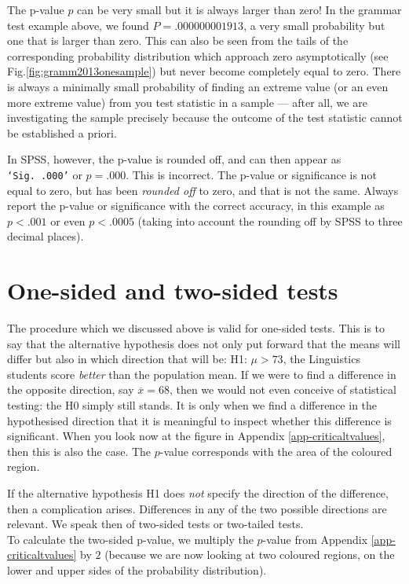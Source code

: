 \documentclass[
]{book}
\begin{document}
The p-value \(p\) can be very small but it is always larger than zero!
In the grammar test example above,
we found \(P=.000000001913\), a very small probability but one that is larger
than zero. This can also be seen from the tails of the corresponding
probability distribution which approach zero asymptotically (see
Fig.\ref{fig:gramm2013onesample}) but never become completely equal
to zero. There is always a minimally small probability of finding
an extreme value (or an even more extreme value) from you test statistic
in a sample --- after all, we are investigating the sample precisely
because the outcome of the test statistic cannot be established a priori.

In SPSS, however, the p-value is rounded off, and can then appear as
\texttt{‘Sig.\ .000’} or \(p=.000\). This is incorrect.
The p-value or significance is not equal to zero, but has
been \emph{rounded off} to zero, and that is not the same.
Always report the p-value or significance with the correct
accuracy, in this example as \(p<.001\) or even \(p<.0005\)
(taking into account the rounding off by SPSS to three decimal
places).

\hypertarget{sec:ttest-onesidedtwosided}{%
\section{One-sided and two-sided tests}\label{sec:ttest-onesidedtwosided}}

The procedure which we discussed above is valid for one-sided
tests. This is to say that the alternative hypothesis does not only put forward
that the means will differ but also in which direction that will be:
H1: \(\mu >73\), the Linguistics students score \emph{better} than the population
mean. If we were to find a difference in the opposite direction,
say \(\overline{x}=68\), then we would not even conceive of statistical testing:
the H0 simply still stands. It is only when we find a difference
in the hypothesised direction that it is meaningful to inspect whether
this difference is significant. When you look now at the figure in
Appendix \ref{app-criticaltvalues}, then this is also the case. The \(p\)-value
corresponds with the area of the coloured region.

If the alternative hypothesis H1 does \emph{not} specify the direction of the
difference, then a complication arises. Differences in any of the two possible directions
are relevant. We speak then of two-sided tests or two-tailed tests.\\
To calculate the two-sided p-value, we multiply the \(p\)-value from
Appendix \ref{app-criticaltvalues} by \(2\) (because we are now looking at two
coloured regions, on the lower and upper sides of the probability distribution).
\end{document}

